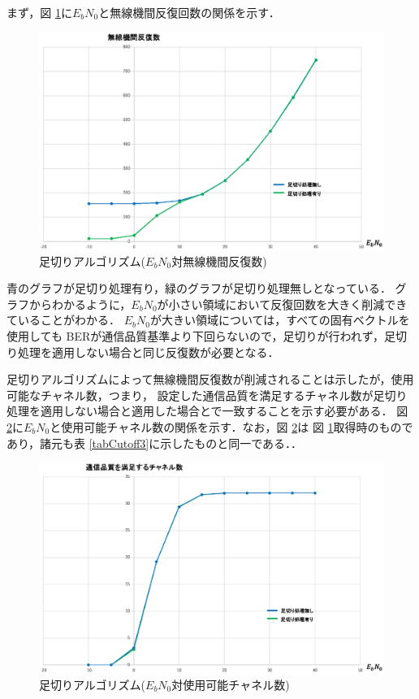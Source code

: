 まず，図 \ref{figCutoffSim3}に$E_bN_0$と無線機間反復回数の関係を示す．

\begin{figure}[ht]
    \centering
    \includegraphics[width=0.95\linewidth]{chapter4/figure/CutoffSim3.eps}
    \caption{足切りアルゴリズム($E_bN_0$対無線機間反復数)}
    \label{figCutoffSim3}
\end{figure}

青のグラフが足切り処理有り，緑のグラフが足切り処理無しとなっている．
グラフからわかるように，$E_bN_0$が小さい領域において反復回数を大きく削減できていることがわかる．
$E_bN_0$が大きい領域については，すべての固有ベクトルを使用しても
BERが通信品質基準より下回らないので，足切りが行われず，足切り処理を適用しない場合と同じ反復数が必要となる．

足切りアルゴリズムによって無線機間反復数が削減されることは示したが，使用可能なチャネル数，つまり，
設定した通信品質を満足するチャネル数が足切り処理を適用しない場合と適用した場合とで一致することを示す必要がある．
図 \ref{figCutoffSim4}に$E_bN_0$と使用可能チャネル数の関係を示す．なお，図 \ref{figCutoffSim4}は
図 \ref{figCutoffSim3}取得時のものであり，諸元も表 \ref{tabCutoff3}に示したものと同一である．．

\begin{figure}[ht]
    \centering
    \includegraphics[width=0.95\linewidth]{chapter4/figure/CutoffSim4.eps}
    \caption{足切りアルゴリズム($E_bN_0$対使用可能チャネル数)}
    \label{figCutoffSim4}
\end{figure}

